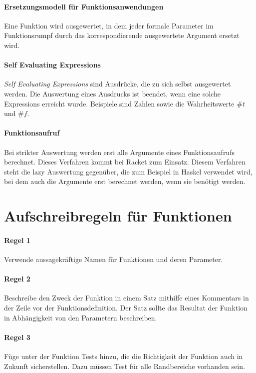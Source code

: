 \documentclass[../main.tex]{subfiles}
\begin{document}
        \paragraph{Ersetzungsmodell für Funktionsanwendungen}
            Eine Funktion wird ausgewertet, in dem jeder formale Parameter im Funktionsrumpf durch das korrespondierende ausgewertete Argument ersetzt wird.
            
        \paragraph{Self Evaluating Expressions}
            \emph{Self Evaluating Expressions} sind Ausdrücke, die zu sich selbst ausgewertet werden. Die Auswertung eines Ausdrucks ist beendet, wenn eine solche Expressions erreicht wurde. Beispiele sind Zahlen sowie die Wahrheitswerte $\#t$ und $\#f$.
            
        \paragraph{Funktionsaufruf}
            Bei strikter Auswertung werden erst alle Argumente eines Funktionsaufrufs berechnet. Dieses Verfahren kommt bei Racket zum Einsatz. Diesem Verfahren steht die lazy Auswertung gegenüber, die zum Beispiel in Haskel verwendet wird, bei dem auch die Argumente erst berechnet werden, wenn sie benötigt werden.   
            
    \section{Aufschreibregeln für Funktionen}
        \paragraph{Regel 1}
            Verwende aussagekräftige Namen für Funktionen und deren Parameter.
        
        \paragraph{Regel 2}
            Beschreibe den Zweck der Funktion in einem Satz mithilfe eines Kommentars in der Zeile vor der Funktionsdefinition. Der Satz sollte das Resultat der Funktion in Abhängigkeit von den Parametern beschreiben.
            
        \paragraph{Regel 3}
            Füge unter der Funktion Tests hinzu, die die Richtigkeit der Funktion auch in Zukunft sicherstellen. Dazu müssen Test für alle Randbereiche vorhanden sein.
            
\end{document}
